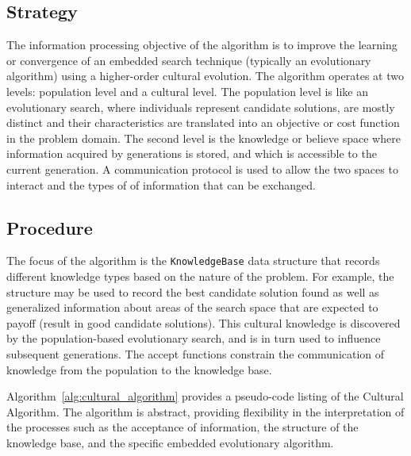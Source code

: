 \subsection{Strategy}
The information processing objective of the algorithm is to improve the learning or convergence of an embedded search technique (typically an evolutionary algorithm) using a higher-order cultural evolution. 
The algorithm operates at two levels: population level and a cultural level. The population level is like an evolutionary search, where individuals represent candidate solutions, are mostly distinct and their characteristics are translated into an objective or cost function in the problem domain. The second level is the knowledge or believe space where information acquired by generations  is stored, and which is accessible to the current generation. A communication protocol is used to allow the two spaces to interact and the types of of information that can be exchanged.

\subsection{Procedure}
The focus of the algorithm is the \texttt{KnowledgeBase} data structure that records different knowledge types based on the nature of the problem. For example, the structure may be used to record the best candidate solution found as well as generalized information about areas of the search space that are expected to payoff (result in good candidate solutions). This cultural knowledge is discovered by the population-based evolutionary search, and is in turn used to influence subsequent generations. The accept functions constrain the communication of knowledge from the population to the knowledge base.

Algorithm~\ref{alg:cultural_algorithm} provides a pseudo-code listing of the Cultural Algorithm. The algorithm is abstract, providing flexibility in the interpretation of the processes such as the acceptance of information, the structure of the knowledge base, and the specific embedded evolutionary algorithm.


